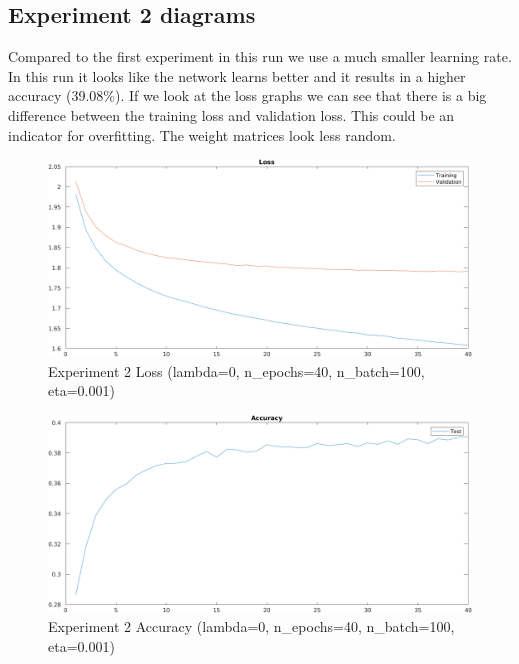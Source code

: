 \clearpage
\subsection{Experiment 2 diagrams}
Compared to the first experiment in this run we use a much smaller learning rate. In this run it looks like the network learns better and it results in a higher
accuracy (39.08\%). If we look at the loss graphs we can see that there is a big difference between the training loss and validation loss. 
This could be an indicator for overfitting. The weight matrices look less random.

    \begin{figure}[ht]
        \includegraphics[width=\textwidth]{../code/result_pics/lambda=0, n_epochs=40, n_batch=100, eta=.001/loss.png}
        \caption{Experiment 2 Loss (lambda=0, n\_epochs=40, n\_batch=100, eta=0.001)}
        \label{fig:loss2}
    \end{figure}

    \begin{figure}[ht]
        \includegraphics[width=\textwidth]{../code/result_pics/lambda=0, n_epochs=40, n_batch=100, eta=.001/accuracy.png}
        \caption{Experiment 2 Accuracy (lambda=0, n\_epochs=40, n\_batch=100, eta=0.001)}
        \label{fig:accuracy2}
    \end{figure}

